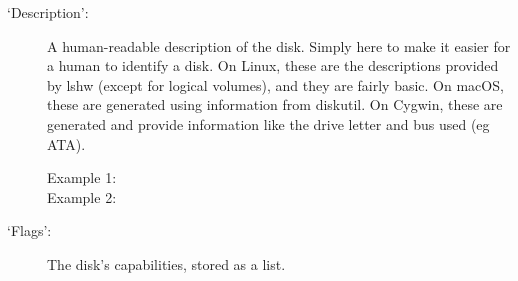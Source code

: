 \documentclass[letterpaper,10pt,english]{sphinxmanual}
\begin{document}
\begin{description}
\begin{description}
\end{description}

\item[{‘Description’:}] \leavevmode
A human-readable description of the disk. Simply here to make it easier
for a human to identify a disk. On Linux, these are the descriptions provided by
lshw (except for logical volumes), and they are fairly basic. On macOS, these are
generated using information from diskutil. On Cygwin, these are generated and provide
information like the drive letter and bus used (eg ATA).
\begin{description}
\item[{Example 1:}] \leavevmode
\begin{sphinxVerbatim}[commandchars=\\\{\}]
\PYG{p}{[}\PYG{p}{]}\PYG{p}{[}\PYG{p}{]}
\end{sphinxVerbatim}

\item[{Example 2:}] \leavevmode
\begin{sphinxVerbatim}[commandchars=\\\{\}]
\PYG{p}{[}\PYG{p}{]}\PYG{p}{[}\PYG{p}{]}
\end{sphinxVerbatim}

\end{description}

\item[{‘Flags’:}] \leavevmode
The disk’s capabilities, stored as a list.


\end{description}
\end{document}
